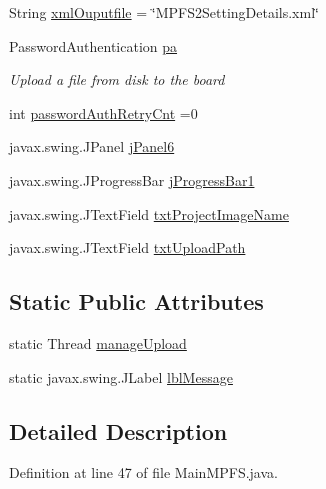 \begin{DoxyCompactItemize}
\item 
String \hyperlink{class_microchip_m_p_f_s_1_1_main_m_p_f_s_a886bb4502d02da005ccbe15c23a80d72}{xml\+Ouputfile} = \char`\"{}M\+P\+F\+S2\+Setting\+Details.\+xml\char`\"{}
\item 
Password\+Authentication \hyperlink{class_microchip_m_p_f_s_1_1_main_m_p_f_s_a0c2e99bc0a1694315e6941fb4ae6bbd9}{pa}
\begin{DoxyCompactList}\small\item\em Upload a file from disk to the board \end{DoxyCompactList}\item 
int \hyperlink{class_microchip_m_p_f_s_1_1_main_m_p_f_s_ae483b74d95985e21e780c8421fcef770}{password\+Auth\+Retry\+Cnt} =0
\item 
javax.\+swing.\+J\+Panel \hyperlink{class_microchip_m_p_f_s_1_1_main_m_p_f_s_a6270d984ca5fbe234b28066eeaab490c}{j\+Panel6}
\item 
javax.\+swing.\+J\+Progress\+Bar \hyperlink{class_microchip_m_p_f_s_1_1_main_m_p_f_s_a26cce173cb32646f3d2f81150ffc288f}{j\+Progress\+Bar1}
\item 
javax.\+swing.\+J\+Text\+Field \hyperlink{class_microchip_m_p_f_s_1_1_main_m_p_f_s_a843b73d561e7278212a2ba02c88739d3}{txt\+Project\+Image\+Name}
\item 
javax.\+swing.\+J\+Text\+Field \hyperlink{class_microchip_m_p_f_s_1_1_main_m_p_f_s_ae7a81f3af2ebfd2aa1ddfbe194be655f}{txt\+Upload\+Path}
\end{DoxyCompactItemize}
\subsection*{Static Public Attributes}
\begin{DoxyCompactItemize}
\item 
static Thread \hyperlink{class_microchip_m_p_f_s_1_1_main_m_p_f_s_ae92192477b6387d556fa354a00a2fdcd}{manage\+Upload}
\item 
static javax.\+swing.\+J\+Label \hyperlink{class_microchip_m_p_f_s_1_1_main_m_p_f_s_a2f31a71a7ccc510c3b1624af3626ef89}{lbl\+Message}
\end{DoxyCompactItemize}


\subsection{Detailed Description}


Definition at line 47 of file Main\+M\+P\+F\+S.\+java.




